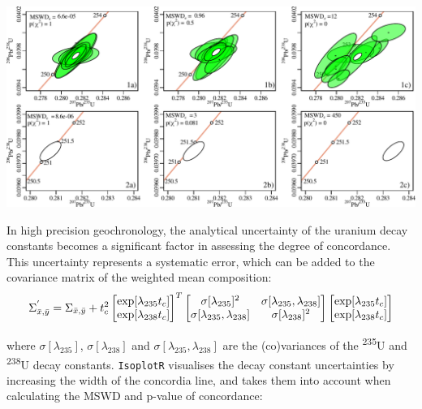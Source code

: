 \begin{refsection}
\noindent\includegraphics[width=\textwidth]{../figures/concordia_MSWD.pdf}
\begingroup {}\endgroup

In high precision geochronology, the analytical uncertainty of the
uranium decay constants becomes a significant factor in assessing the
degree of concordance. This uncertainty represents a systematic error,
which can be added to the covariance matrix of the weighted mean
composition:
\begin{equation}
  \Sigma_{\bar{x},\bar{y}}^{'} =
  \Sigma_{\bar{x},\bar{y}} + t_c^2
  \left[
    \begin{array}{@{}c@{}}
      \exp[\lambda_{235}t_c] \\
      \exp[\lambda_{238}t_c]      
    \end{array}
    \right]^T
  \left[
    \begin{array}{@{}cc@{}}
      \sigma[\lambda_{235}]^2 & \sigma[\lambda_{235},\lambda_{238}] \\
      \sigma[\lambda_{235},\lambda_{238}] & \sigma[\lambda_{238}]^2
    \end{array}
    \right]
  \left[
    \begin{array}{@{}c@{}}
      \exp[\lambda_{235}t_c]\\
      \exp[\lambda_{238}t_c]
    \end{array}
    \right]
  \label{eq:systematicUPb}
\end{equation}

\noindent where $\sigma[\lambda_{235}]$, $\sigma[\lambda_{238}]$ and
$\sigma[\lambda_{235},\lambda_{238}]$ are the (co)variances of the
\textsuperscript{235}U and \textsuperscript{238}U decay constants.
\texttt{IsoplotR} visualises the decay constant uncertainties by
increasing the width of the concordia line, and takes them into
account when calculating the MSWD and p-value of concordance:


\end{refsection}
